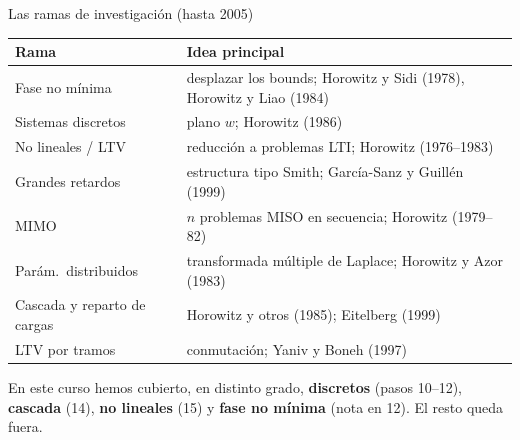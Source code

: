 \documentclass[aspectratio=169,11pt]{beamer}
\begin{document}
\begin{frame}{Las ramas de investigación (hasta 2005)}
  \small
  \begin{center}\footnotesize
  \begin{tabular}{ll}
    \hline
    Rama & Idea principal\\
    \hline
    Fase no mínima & desplazar los bounds; Horowitz y Sidi (1978), Horowitz y Liao (1984)\\
    Sistemas discretos & plano $w$; Horowitz (1986)\\
    No lineales / LTV & reducción a problemas LTI; Horowitz (1976--1983)\\
    Grandes retardos & estructura tipo Smith; García-Sanz y Guillén (1999)\\
    MIMO & $n$ problemas MISO en secuencia; Horowitz (1979--82)\\
    Parám.\ distribuidos & transformada múltiple de Laplace; Horowitz y Azor (1983)\\
    Cascada y reparto de cargas & Horowitz y otros (1985); Eitelberg (1999)\\
    LTV por tramos & conmutación; Yaniv y Boneh (1997)\\
    \hline
  \end{tabular}
  \end{center}
  \footnotesize En este curso hemos cubierto, en distinto grado, \textbf{discretos} (pasos 10--12), \textbf{cascada} (14), \textbf{no lineales} (15) y \textbf{fase no mínima} (nota en 12). El resto queda fuera.
\end{frame}
\end{document}

